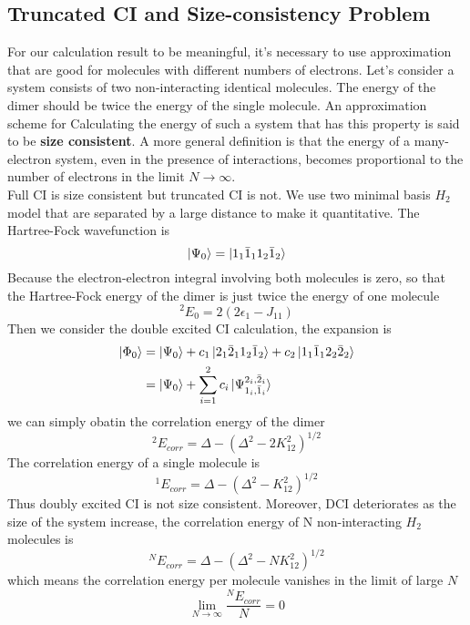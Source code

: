\documentclass[11pt]{article}
\begin{document}
\subsection{Truncated CI and Size-consistency Problem}
For our calculation result to be meaningful, it's necessary to use approximation that are good for molecules with
different numbers of electrons. Let's consider a system consists of two non-interacting identical molecules. The energy
of the dimer should be twice the energy of the single molecule. An approximation scheme for Calculating the energy of such
a system that has this property is said to be \textbf{size consistent}. A more general definition is that the energy
of a many-electron system, even in the presence of interactions, becomes proportional to the number of electrons in the
limit $N\rightarrow\infty$.\\
Full CI is size consistent but truncated CI is not. We use two minimal basis $H_2$ model that are separated by a large distance
to make it quantitative. The Hartree-Fock wavefunction is
\begin{equation}
    \ket{\Psi_0}=\ket{1_1\bar{1}_1 1_2\bar{1}_2}
\end{equation}
Because the electron-electron integral involving both molecules is zero, so that the Hartree-Fock energy of the dimer is just
twice the energy of one molecule
\begin{equation}
    {}^2E_0=2(2\epsilon_1-J_{11})
\end{equation}
Then we consider the double excited CI calculation, the expansion is
\begin{align}
    \ket{\Phi_0}&=\ket{\Psi_0}+c_1\ket{2_1\bar{2}_1 1_2\bar{1}_2}+c_2\ket{1_1\bar{1}_1 2_2\bar{2}_2}\notag\\
    &=\ket{\Psi_0}+\sum_{i=1}^{2}c_i\ket{\Psi_{1_i,\bar{1}_i}^{2_i,\bar{2}_i}}
\end{align}
we can simply obatin the correlation energy of the dimer
\begin{equation}
    {}^2E_{corr}=\Delta-{(\Delta^2-2K_{12}^2)}^{1/2}
\end{equation}
The correlation energy of a single molecule is  
\begin{equation}
    {}^1E_{corr}=\Delta-{(\Delta^2-K_{12}^2)}^{1/2}
\end{equation}
Thus doubly excited CI is not size consistent. Moreover, DCI deteriorates as the size of the system increase, the
correlation energy of N non-interacting $H_2$ molecules is
\begin{equation}
    {}^N E_{corr}=\Delta-{(\Delta^2-NK_{12}^2)}^{1/2}
\end{equation}
which means the correlation energy per molecule vanishes in the limit of large $N$
\begin{equation}
    \lim_{N \to \infty} \frac{{}^N E_{corr}}{N}=0
\end{equation}
\end{document}
